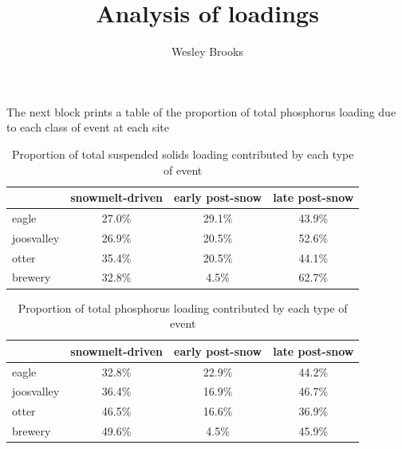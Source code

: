 \documentclass[12pt]{article}
\title{Analysis of loadings}
\author{Wesley Brooks}
\date{}                                           %
\begin{document}
\maketitle



















The next block prints a table of the proportion of total phosphorus loading due to each class of event at each site\\


\begin{table}[h]
\begin{center}
\begin{tabular}{lccc}
  & snowmelt-driven & early post-snow & late post-snow \\ 
  \hline
eagle & 27.0\% & 29.1\% & 43.9\% \\ 
  joosvalley & 26.9\% & 20.5\% & 52.6\% \\ 
  otter & 35.4\% & 20.5\% & 44.1\% \\ 
  brewery & 32.8\% & 4.5\% & 62.7\% \\ 
  \end{tabular}
\caption{Proportion of total suspended solids loading contributed by each type of event}
\label{tab:stot}
\end{center}
\end{table}
\begin{table}[h]
\begin{center}
\begin{tabular}{lccc}
  & snowmelt-driven & early post-snow & late post-snow \\ 
  \hline
eagle & 32.8\% & 22.9\% & 44.2\% \\ 
  joosvalley & 36.4\% & 16.9\% & 46.7\% \\ 
  otter & 46.5\% & 16.6\% & 36.9\% \\ 
  brewery & 49.6\% & 4.5\% & 45.9\% \\ 
  \end{tabular}
\caption{Proportion of total phosphorus loading contributed by each type of event}
\label{tab:ptot}
\end{center}
\end{table}
\end{document}
